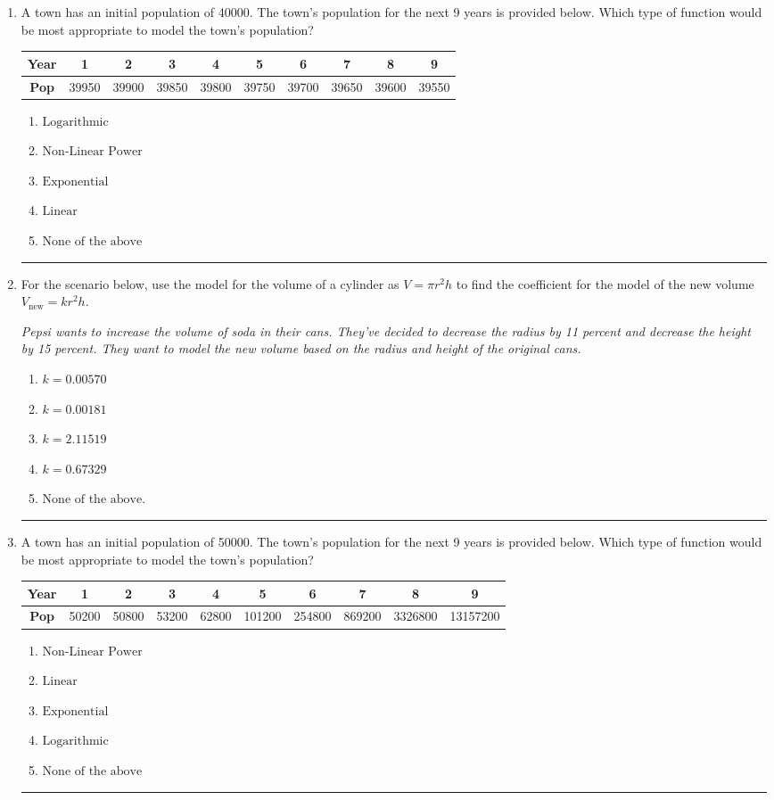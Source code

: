 \documentclass[14pt]{extbook}
\newcommand{\litem}[1]{\item#1\hspace*{-1cm}\rule{\textwidth}{0.4pt}}
\begin{document}
\begin{enumerate}
{\begin{enumerate}[label=\Alph*.]
\end{enumerate} }
\litem{
A town has an initial population of 40000. The town's population for the next 9 years is provided below. Which type of function would be most appropriate to model the town's population?

\begin{tabular}{c|c|c|c|c|c|c|c|c|c}
\textbf{Year} &1 &2 &3 &4 &5 &6 &7 &8 &9\tabularnewline \hline
\textbf{Pop} &39950 &39900 &39850 &39800 &39750 &39700 &39650 &39600 &39550\end{tabular}\begin{enumerate}[label=\Alph*.]
\item \( \text{Logarithmic} \)
\item \( \text{Non-Linear Power} \)
\item \( \text{Exponential} \)
\item \( \text{Linear} \)
\item \( \text{None of the above} \)

\end{enumerate} }
\litem{
For the scenario below, use the model for the volume of a cylinder as $V = \pi r^2 h$ to find the coefficient for the model of the new volume $V_{\text{new}} = k r^2 h$.
\begin{center}
    \textit{ Pepsi wants to increase the volume of soda in their cans. They've decided to decrease the radius by 11 percent and decrease the height by 15 percent. They want to model the new volume based on the radius and height of the original cans. }
\end{center}
\begin{enumerate}[label=\Alph*.]
\item \( k = 0.00570 \)
\item \( k = 0.00181 \)
\item \( k = 2.11519 \)
\item \( k = 0.67329 \)
\item \( \text{None of the above.} \)

\end{enumerate} }
\litem{
A town has an initial population of 50000. The town's population for the next 9 years is provided below. Which type of function would be most appropriate to model the town's population?

\begin{tabular}{c|c|c|c|c|c|c|c|c|c}
\textbf{Year} &1 &2 &3 &4 &5 &6 &7 &8 &9\tabularnewline \hline
\textbf{Pop} &50200 &50800 &53200 &62800 &101200 &254800 &869200 &3326800 &13157200\end{tabular}\begin{enumerate}[label=\Alph*.]
\item \( \text{Non-Linear Power} \)
\item \( \text{Linear} \)
\item \( \text{Exponential} \)
\item \( \text{Logarithmic} \)
\item \( \text{None of the above} \)

\end{enumerate} }
\end{enumerate}
\end{document}
